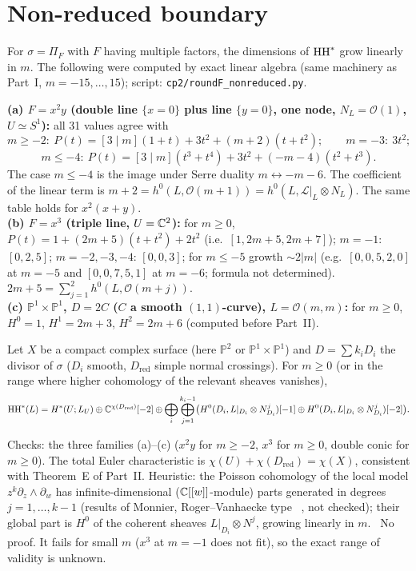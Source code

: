 \section{Non-reduced boundary}\label{sec:nonred}
For $\sigma=\Pi_F$ with $F$ having multiple factors, the dimensions of $\mathrm{HH}^*$ grow linearly in $m$. The following were computed by exact linear algebra (same machinery as Part~I, $m=-15,\dots,15$); script: \texttt{cp2/roundF\_nonreduced.py}.
\begin{obs}\tV\label{obs:nr}
\textbf{(a) $F=x^2y$ (double line $\{x=0\}$ plus line $\{y=0\}$, one node, $N_L=\mathcal O(1)$, $U\simeq S^1$):} all 31 values agree with
\[m\ge-2:\ P(t)=[3\mid m](1+t)+3t^2+(m+2)(t+t^2);\qquad m=-3:\ 3t^2;\]
\[m\le-4:\ P(t)=[3\mid m](t^3+t^4)+3t^2+(-m-4)(t^2+t^3).\]
The case $m\le-4$ is the image under Serre duality $m\leftrightarrow-m-6$. The coefficient of the linear term is $m+2=h^0(L,\mathcal O(m+1))=h^0(L,\mathcal L|_L\otimes N_L)$. The same table holds for $x^2(x+y)$.\\
\textbf{(b) $F=x^3$ (triple line, $U=\mathbb C^2$):} for $m\ge0$, $P(t)=1+(2m+5)(t+t^2)+2t^2$ (i.e.\ $[1,2m+5,2m+7]$); $m=-1$: $[0,2,5]$; $m=-2,-3,-4$: $[0,0,3]$; for $m\le-5$ growth $\sim2|m|$ (e.g.\ $[0,0,5,2,0]$ at $m=-5$ and $[0,0,7,5,1]$ at $m=-6$; formula not determined). $2m+5=\sum_{j=1}^2h^0(L,\mathcal O(m+j))$.\\
\textbf{(c) $\mathbb P^1\times\mathbb P^1$, $D=2C$ ($C$ a smooth $(1,1)$-curve), $L=\mathcal O(m,m)$:} for $m\ge0$, $H^0=1$, $H^1=2m+3$, $H^2=2m+6$ (computed before Part~II).
\end{obs}
\begin{conj}\tK\label{conj:NR}
Let $X$ be a compact complex surface (here $\mathbb P^2$ or $\mathbb P^1\times\mathbb P^1$) and $D=\sum k_iD_i$ the divisor of $\sigma$ ($D_i$ smooth, $D_{\mathrm{red}}$ simple normal crossings). For $m\ge0$ (or in the range where higher cohomology of the relevant sheaves vanishes),
\[\mathrm{HH}^*(L)=H^*(U;L_U)\oplus\mathbb C^{\chi(D_{\mathrm{red}})}[-2]\oplus\bigoplus_i\bigoplus_{j=1}^{k_i-1}\bigl(H^0(D_i,L|_{D_i}\otimes N_{D_i}^{j})[-1]\oplus H^0(D_i,L|_{D_i}\otimes N_{D_i}^{j})[-2]\bigr).\]
\end{conj}
\noindent Checks: the three families (a)--(c) ($x^2y$ for $m\ge-2$, $x^3$ for $m\ge0$, double conic for $m\ge0$). The total Euler characteristic is $\chi(U)+\chi(D_{\mathrm{red}})=\chi(X)$, consistent with Theorem~E of Part~II. Heuristic: the Poisson cohomology of the local model $z^k\partial_z\wedge\partial_w$ has infinite-dimensional ($\mathbb C[[w]]$-module) parts generated in degrees $j=1,\dots,k-1$ (results of Monnier, Roger--Vanhaecke type \tC\ \tQ, not checked); their global part is $H^0$ of the coherent sheaves $L|_{D_i}\otimes N^j$, growing linearly in $m$. \tK\ No proof. It fails for small $m$ ($x^3$ at $m=-1$ does not fit), so the exact range of validity is unknown.

